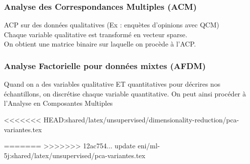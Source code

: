 
\begin{frame}
  \frametitle{Analyse des Correspondances Multiples (ACM)}
  ACP sur des données qualitatives (Ex : enquètes d'opinions avec QCM) \\
  Chaque variable qualitative est transformé en vecteur sparse. \\
  On obtient une matrice binaire sur laquelle on procède à l'ACP.\\
\end{frame}

\begin{frame}
  \frametitle{Analyse Factorielle pour données mixtes (AFDM)}
  Quand on a des variables qualitative ET quantitatives pour décrires nos échantillons, on discrétise chaque variable quantitative. On peut ainsi procéder à l'Analyse en Composantes Multiples
\end{frame}
<<<<<<< HEAD:shared/latex/unsupervised/dimensionality-reduction/pca-variantes.tex

=======
>>>>>>> 12ac754... update eni/ml-5j:shared/latex/unsupervised/pca-variantes.tex
